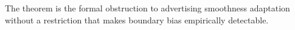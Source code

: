 The theorem is the formal obstruction to advertising smoothness adaptation without a restriction that makes boundary bias empirically detectable.